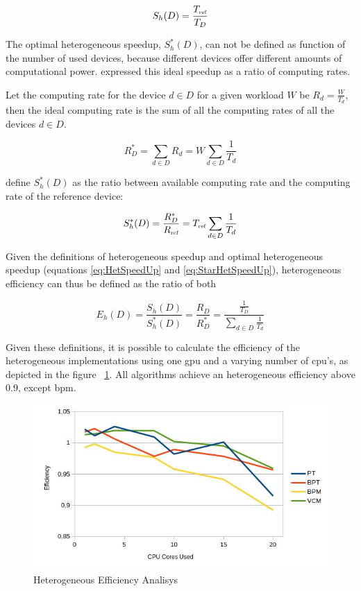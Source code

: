 \begin{equation}
S_h(D) = \frac{T_{\mbox{\tiny ref}}}{T_D}
\label{eq:HetSpeedUp}
\end{equation}

The optimal heterogeneous speedup, $S_h^*(D)$, can not be defined as function of the number of used devices, because different devices offer different amounts of computational power. \cite{Chamberlain98} expressed this ideal speedup as a ratio of computing rates. 

Let the computing rate for the device $d \in D$ for a given workload $W$ be $R_d = \frac{W}{T_d}$, then the ideal computing rate is the sum of all the computing rates of all the devices $d \in D$.

\begin{equation}
R^*_D = \sum_{d \in D} R_d = W \sum_{d \in D} \frac{1}{T_d}
\label{eq:StarCapacity}
\end{equation}

\cite{Chamberlain98} define $S_h^*(D)$ as the ratio between available computing rate and the computing rate of the reference device:

\begin{equation}
S^*_h(D) = \frac{R^*_D}{R_{\mbox{\tiny ref}}} = T_{\mbox{\tiny ref}} \sum_{d \in D} \frac{1}{T_d}
\label{eq:StarHetSpeedUp}
\end{equation}

Given the definitions of heterogeneous speedup and optimal heterogeneous speedup (equations \ref{eq:HetSpeedUp} and \ref{eq:StarHetSpeedUp}), heterogeneous efficiency can thus be defined as the ratio of both

\begin{equation}
E_h(D) = \frac{S_h(D)}{S_h^*(D)} = \frac{R_D}{R^*_D} = \frac{\frac{1}{T_D}}{\sum_{d \in D} \frac{1}{T_d}}
\label{eq:HetEff}
\end{equation}

Given these definitions, it is possible to calculate the efficiency of the heterogeneous implementations using one \gls{gpu} and a varying number of \gls{cpu}'s, as depicted in the figure ~\ref{img:hefficiency}. All algorithms achieve an heterogeneous efficiency above 0.9, except \gls{bpm}.

\begin{figure}[H]
\centering
\includegraphics[width=0.8\linewidth]{img/hefficiency.jpg}
\caption{\label{img:hefficiency} Heterogeneous Efficiency Analisys}
\end{figure}


